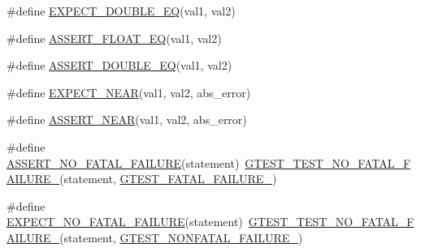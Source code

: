 \begin{DoxyCompactItemize}
\item 
\#define \mbox{\hyperlink{_obj__test_2lib_2googletest-release-1_88_81_2googletest_2include_2gtest_2gtest_8h_ab4852f9430cf656690256ea7fe6323b8}{E\+X\+P\+E\+C\+T\+\_\+\+D\+O\+U\+B\+L\+E\+\_\+\+EQ}}(val1,  val2)
\item 
\#define \mbox{\hyperlink{_obj__test_2lib_2googletest-release-1_88_81_2googletest_2include_2gtest_2gtest_8h_a4663ffbf844baa54bdb29f9148fd0f96}{A\+S\+S\+E\+R\+T\+\_\+\+F\+L\+O\+A\+T\+\_\+\+EQ}}(val1,  val2)
\item 
\#define \mbox{\hyperlink{_obj__test_2lib_2googletest-release-1_88_81_2googletest_2include_2gtest_2gtest_8h_a6617da62e5ae5490995a3bfca1f331a9}{A\+S\+S\+E\+R\+T\+\_\+\+D\+O\+U\+B\+L\+E\+\_\+\+EQ}}(val1,  val2)
\item 
\#define \mbox{\hyperlink{_obj__test_2lib_2googletest-release-1_88_81_2googletest_2include_2gtest_2gtest_8h_a88cd7978af0e7dbd42cd606dfabdcc6f}{E\+X\+P\+E\+C\+T\+\_\+\+N\+E\+AR}}(val1,  val2,  abs\+\_\+error)
\item 
\#define \mbox{\hyperlink{_obj__test_2lib_2googletest-release-1_88_81_2googletest_2include_2gtest_2gtest_8h_a73cce6b752d204f91a36bef2f8e663b3}{A\+S\+S\+E\+R\+T\+\_\+\+N\+E\+AR}}(val1,  val2,  abs\+\_\+error)
\item 
\#define \mbox{\hyperlink{_obj__test_2lib_2googletest-release-1_88_81_2googletest_2include_2gtest_2gtest_8h_a5034fda3490aad5a93942ac83f4cea49}{A\+S\+S\+E\+R\+T\+\_\+\+N\+O\+\_\+\+F\+A\+T\+A\+L\+\_\+\+F\+A\+I\+L\+U\+RE}}(statement)~\mbox{\hyperlink{_obj__test_2lib_2googletest-release-1_88_81_2googletest_2include_2gtest_2internal_2gtest-internal_8h_a1b37a3c446836d33040f3266a6236081}{G\+T\+E\+S\+T\+\_\+\+T\+E\+S\+T\+\_\+\+N\+O\+\_\+\+F\+A\+T\+A\+L\+\_\+\+F\+A\+I\+L\+U\+R\+E\+\_\+}}(statement, \mbox{\hyperlink{_obj__test_2lib_2googletest-release-1_88_81_2googletest_2include_2gtest_2internal_2gtest-internal_8h_a0f9a4c3ea82cc7bf4478eaffdc168358}{G\+T\+E\+S\+T\+\_\+\+F\+A\+T\+A\+L\+\_\+\+F\+A\+I\+L\+U\+R\+E\+\_\+}})
\item 
\#define \mbox{\hyperlink{_obj__test_2lib_2googletest-release-1_88_81_2googletest_2include_2gtest_2gtest_8h_a067c02ccaf3171d6e1781cd0f8cdcf74}{E\+X\+P\+E\+C\+T\+\_\+\+N\+O\+\_\+\+F\+A\+T\+A\+L\+\_\+\+F\+A\+I\+L\+U\+RE}}(statement)~\mbox{\hyperlink{_obj__test_2lib_2googletest-release-1_88_81_2googletest_2include_2gtest_2internal_2gtest-internal_8h_a1b37a3c446836d33040f3266a6236081}{G\+T\+E\+S\+T\+\_\+\+T\+E\+S\+T\+\_\+\+N\+O\+\_\+\+F\+A\+T\+A\+L\+\_\+\+F\+A\+I\+L\+U\+R\+E\+\_\+}}(statement, \mbox{\hyperlink{_obj__test_2lib_2googletest-release-1_88_81_2googletest_2include_2gtest_2internal_2gtest-internal_8h_a6cb7482cfa03661a91c698eb5895f642}{G\+T\+E\+S\+T\+\_\+\+N\+O\+N\+F\+A\+T\+A\+L\+\_\+\+F\+A\+I\+L\+U\+R\+E\+\_\+}})

\end{DoxyCompactItemize}
